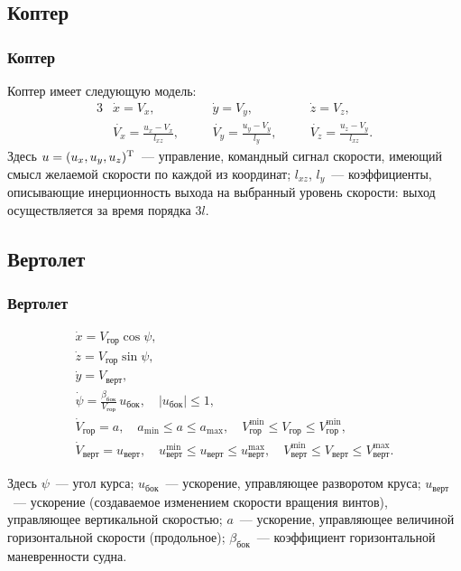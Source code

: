 \documentclass[10pt,t]{beamer}
\begin{document}
\subsection[Коптер]{Коптер}
\begin{frame}
\frametitle{Коптер}
\small

Коптер имеет следующую модель:
\begin{alignat*}{3}
  & \dot{x} = V_x, & \quad & \dot{y} = V_y, & \quad
    & \dot{z} = V_z, \\
  & \displaystyle
    \dot{V_x} = \frac{u_x - V_x}{l_{xz}},  & &
    \dot{V_y} = \frac{u_y - V_y}{l_{y}},   & &
    \dot{V_z} = \frac{u_z - V_y}{l_{xz}}.
\end{alignat*}
Здесь $u = (u_x, u_y, u_z)^\text{\textup{T}}$~--- управление, командный сигнал скорости, имеющий смысл желаемой скорости по каждой из координат; $l_{xz}$, $l_y$~--- коэффициенты, описывающие инерционность выхода на выбранный уровень скорости: выход осуществляется за время порядка $3l$. 
\end{frame}
\subsection[Вертолет]{Вертолет}
\begin{frame}
\frametitle{Вертолет}
\small

\begin{equation*}
  \begin{array}{l}
    \dot x = V_\text{гор} \cos \psi, \\[0.75ex]
    \dot z = V_\text{гор} \sin \psi, \\[0.75ex]
    \dot y = V_\text{верт}, \\[0.75ex]
    \dot \psi   = \frac{\beta_\text{бок}}{V_\text{гор}} \, u_\text{бок}, \quad |u_\text{бок}| \leqslant 1, \\[0.75ex]
    \dot V_\text{гор} = a, \quad  
      a_{\min} \leqslant a \leqslant a_{\max},
      \quad V^{\min}_\text{гор} \leqslant V_\text{гор} \leqslant V^{\min}_\text{гор}, \\[0.75ex]
    \dot V_\text{верт} = u_\text{верт},
      \quad u^{\min}_\text{верт} \leqslant u_\text{верт} \leqslant u^{\max}_\text{верт}, \quad
      V^{\min}_\text{верт} \leqslant V_\text{верт} \leqslant V^{\max}_\text{верт}.
  \end{array}
\end{equation*}

Здесь $\psi$~--- угол курса; $u_\text{бок}$~--- ускорение, управляющее разворотом круса; $u_\text{верт}$~--- ускорение (создаваемое изменением скорости вращения винтов), управляющее вертикальной скоростью; $a$~--- ускорение, управляющее величиной горизонтальной скорости (продольное); $\beta_\text{бок}$~--- коэффициент горизонтальной маневренности судна.

\end{frame}
\end{document}
